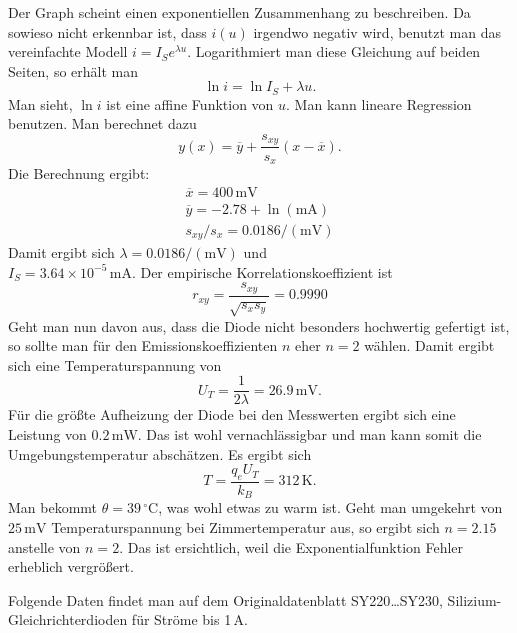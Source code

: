 \documentclass[a4paper,10pt,fleqn,twocolumn,twoside]{article}
\numberwithin{equation}{section}
\begin{document}
\noindent
Der Graph scheint einen exponentiellen Zusammenhang zu
beschreiben. Da sowieso nicht erkennbar ist, dass $i(u)$ irgendwo
negativ wird, benutzt man das vereinfachte Modell
$i=I_Se^{\lambda u}$. Logarithmiert man diese Gleichung auf
beiden Seiten, so erhält man
\begin{equation}
\ln i = \ln I_S + \lambda u.
\end{equation}
Man sieht, $\ln i$ ist eine affine Funktion von $u$. Man kann lineare
Regression benutzen. Man berechnet dazu
\begin{equation}
y(x) = \overline y+\frac{s_{xy}}{s_x}(x-\overline x).
\end{equation}
Die Berechnung ergibt:
\begin{gather*}
\overline x = 400\,\mathrm{mV}\\
\overline y = -2.78+\ln(\mathrm{mA})\\
s_{xy}/s_x = 0.0186/(\mathrm{mV})
\end{gather*}
Damit ergibt sich $\lambda = 0.0186/(\mathrm{mV})$ und\\
$I_S=3.64\times 10^{-5}\,\mathrm{mA}$.
Der empirische Korrelationskoeffizient ist
\begin{equation}
r_{xy} = \frac{s_{xy}}{\sqrt{s_x s_y}} = 0.9990
\end{equation}
Geht man nun davon aus, dass die Diode nicht besonders hochwertig
gefertigt ist, so sollte man für den Emissionskoeffizienten $n$
eher $n=2$ wählen. Damit ergibt sich eine Temperaturspannung von
\begin{equation}
U_T = \frac{1}{2\lambda} = 26.9\,\mathrm{mV}.
\end{equation}
Für die größte Aufheizung der Diode bei den Messwerten ergibt
sich eine Leistung von $0.2\,\mathrm{mW}$. Das ist wohl
vernachlässigbar und man kann somit die Umgebungstemperatur
abschätzen. Es ergibt sich
\begin{equation}
T = \frac{q_e U_T}{k_B} = 312\,\mathrm{K}.
\end{equation}
Man bekommt $\theta = 39\,\mathrm{{}^\circ C}$, was wohl etwas
zu warm ist. Geht man umgekehrt von $25\,\mathrm{mV}$
Temperaturspannung bei Zimmertemperatur aus, so ergibt
sich $n=2.15$ anstelle von $n=2$. Das ist ersichtlich, weil
die Exponentialfunktion Fehler erheblich vergrößert.

Folgende Daten findet man auf dem Originaldatenblatt
{\glqq}SY220{\ldots}SY230, Silizium-Gleichrichterdioden
für Ströme bis 1\,A{\grqq}.
\end{document}
